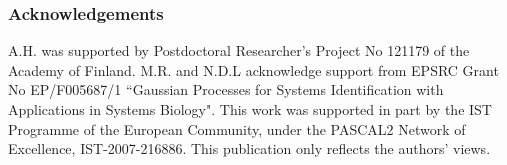 \documentclass[accepted]{article}
\begin{document}

\subsubsection*{Acknowledgements}

A.H. was supported by Postdoctoral Researcher's Project No 121179 of
the Academy of Finland.  M.R. and N.D.L acknowledge support from EPSRC
Grant No EP/F005687/1 ``Gaussian Processes for Systems Identification
with Applications in Systems Biology".  This work was supported in
part by the IST Programme of the European Community, under the PASCAL2
Network of Excellence, IST-2007-216886. This publication only reflects
the authors' views.



\end{document}
